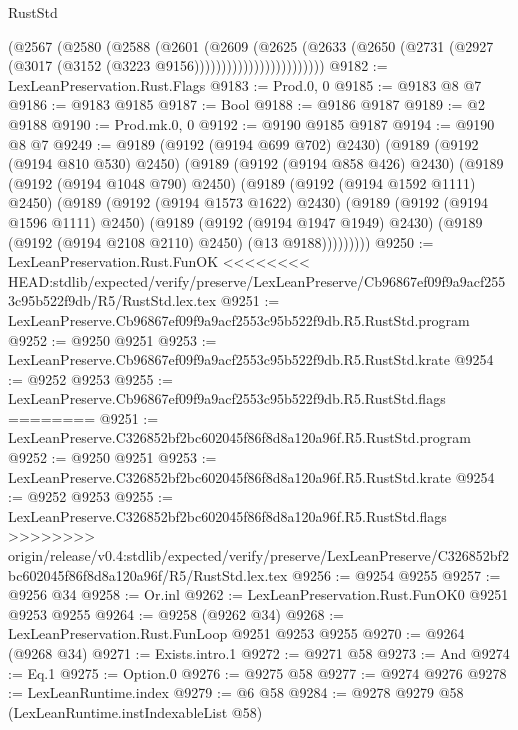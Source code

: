 \begin{lexlean}{RustStd}
\begin{coremodule}
{\begin{coremodule}
{{{{{{{{{{{{{{{{{{{{{{{{{{{{{{{{{{{{{{{{{{{{{{{{{{{{{{{                          (@2567
                            (@2580
                              (@2588
                                (@2601
                                  (@2609
                                    (@2625
                                      (@2633
                                        (@2650
                                          (@2731
                                            (@2927
                                              (@3017 (@3152 (@3223 @9156))))))))))))))))))))))))
@9182 := LexLeanPreservation.Rust.Flags
@9183 := Prod.{0, 0}
@9185 := @9183 @8 @7
@9186 := @9183 @9185
@9187 := Bool
@9188 := @9186 @9187
@9189 := @2 @9188
@9190 := Prod.mk.{0, 0}
@9192 := @9190 @9185 @9187
@9194 := @9190 @8 @7
@9249 := @9189
    (@9192 (@9194 @699 @702) @2430)
    (@9189
      (@9192 (@9194 @810 @530) @2450)
      (@9189
        (@9192 (@9194 @858 @426) @2430)
        (@9189
          (@9192 (@9194 @1048 @790) @2450)
          (@9189
            (@9192 (@9194 @1592 @1111) @2450)
            (@9189
              (@9192 (@9194 @1573 @1622) @2430)
              (@9189
                (@9192 (@9194 @1596 @1111) @2450)
                (@9189
                  (@9192 (@9194 @1947 @1949) @2430)
                  (@9189 (@9192 (@9194 @2108 @2110) @2450) (@13 @9188)))))))))
@9250 := LexLeanPreservation.Rust.FunOK
<<<<<<<< HEAD:stdlib/expected/verify/preserve/LexLeanPreserve/Cb96867ef09f9a9acf2553c95b522f9db/R5/RustStd.lex.tex
@9251 := LexLeanPreserve.Cb96867ef09f9a9acf2553c95b522f9db.R5.RustStd.program
@9252 := @9250 @9251
@9253 := LexLeanPreserve.Cb96867ef09f9a9acf2553c95b522f9db.R5.RustStd.krate
@9254 := @9252 @9253
@9255 := LexLeanPreserve.Cb96867ef09f9a9acf2553c95b522f9db.R5.RustStd.flags
========
@9251 := LexLeanPreserve.C326852bf2bc602045f86f8d8a120a96f.R5.RustStd.program
@9252 := @9250 @9251
@9253 := LexLeanPreserve.C326852bf2bc602045f86f8d8a120a96f.R5.RustStd.krate
@9254 := @9252 @9253
@9255 := LexLeanPreserve.C326852bf2bc602045f86f8d8a120a96f.R5.RustStd.flags
>>>>>>>> origin/release/v0.4:stdlib/expected/verify/preserve/LexLeanPreserve/C326852bf2bc602045f86f8d8a120a96f/R5/RustStd.lex.tex
@9256 := @9254 @9255
@9257 := @9256 @34
@9258 := Or.inl
@9262 := LexLeanPreservation.Rust.FunOK0 @9251 @9253 @9255
@9264 := @9258 (@9262 @34)
@9268 := LexLeanPreservation.Rust.FunLoop @9251 @9253 @9255
@9270 := @9264 (@9268 @34)
@9271 := Exists.intro.{1}
@9272 := @9271 @58
@9273 := And
@9274 := Eq.{1}
@9275 := Option.{0}
@9276 := @9275 @58
@9277 := @9274 @9276
@9278 := LexLeanRuntime.index
@9279 := @6 @58
@9284 := @9278 @9279 @58 (LexLeanRuntime.instIndexableList @58)
}}}}}}}}}}}}}}}}}}}}}}}}}}}}}}}}}}}}}}}}}}}}}}}}}}}}}}}
\end{coremodule}}
\end{coremodule}
\end{lexlean}
